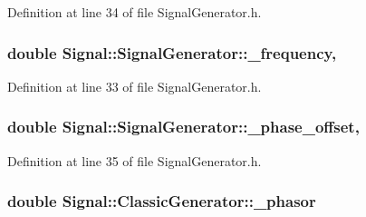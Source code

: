 Definition at line 34 of file Signal\+Generator.\+h.

\hypertarget{class_signal_1_1_signal_generator_a7f107461333bce68c5dad412db96a8c2}{
\subsubsection[{\+\_\+frequency}]{\setlength{\rightskip}{0pt plus 5cm}double Signal\+::\+Signal\+Generator\+::\+\_\+frequency\hspace{0.3cm}{\ttfamily [protected]}, {\ttfamily [inherited]}}}\label{class_signal_1_1_signal_generator_a7f107461333bce68c5dad412db96a8c2}


Definition at line 33 of file Signal\+Generator.\+h.

\hypertarget{class_signal_1_1_signal_generator_a6b4444d46747c8517171edbbf4b5588f}{
\subsubsection[{\+\_\+phase\+\_\+offset}]{\setlength{\rightskip}{0pt plus 5cm}double Signal\+::\+Signal\+Generator\+::\+\_\+phase\+\_\+offset\hspace{0.3cm}{\ttfamily [protected]}, {\ttfamily [inherited]}}}\label{class_signal_1_1_signal_generator_a6b4444d46747c8517171edbbf4b5588f}


Definition at line 35 of file Signal\+Generator.\+h.

\hypertarget{class_signal_1_1_classic_generator_ade9b66bc49d2d2f40a1390fc6374b8b2}{
\subsubsection[{\+\_\+phasor}]{\setlength{\rightskip}{0pt plus 5cm}double Signal\+::\+Classic\+Generator\+::\+\_\+phasor\hspace{0.3cm}{\ttfamily [protected]}}}\label{class_signal_1_1_classic_generator_ade9b66bc49d2d2f40a1390fc6374b8b2}


